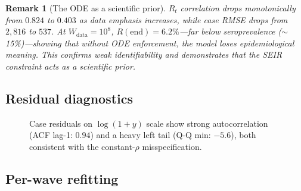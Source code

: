 \documentclass[11pt]{article}
\newtheorem{remark}{Remark}
\begin{document}
\begin{remark}[The ODE as a scientific prior]
$R_t$ correlation drops monotonically from $0.824$ to $0.403$ as data emphasis increases, while case RMSE drops from $2{,}816$ to $537$. At $W_{\mathrm{data}}=10^8$, $R(\mathrm{end})=6.2\%$---far below seroprevalence ($\sim$15\%)---showing that without ODE enforcement, the model loses epidemiological meaning. This confirms weak identifiability and demonstrates that the SEIR constraint acts as a scientific prior.
\end{remark}

\subsection{Residual diagnostics}\label{sec:results:residuals}

\begin{figure}[ht]
\centering
{}
\caption{Case residuals on $\log(1+y)$ scale show strong autocorrelation (ACF lag-1: $0.94$) and a heavy left tail (Q-Q min: $-5.6$), both consistent with the constant-$\rho$ misspecification.}\label{fig:residuals}
\end{figure}

\subsection{Per-wave refitting}\label{sec:results:waves}
\end{document}
